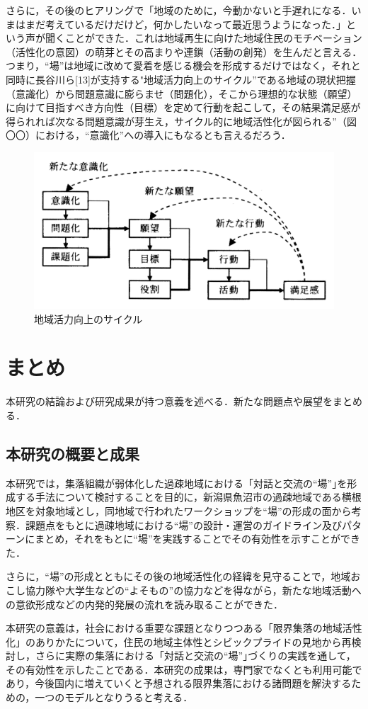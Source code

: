 \documentclass[a4paper]{jsarticle}
\begin{document}
さらに，その後のヒアリングで「地域のために，今動かないと手遅れになる．いまはまだ考えているだけだけど，何かしたいなって最近思うようになった．」という声が聞くことができた．これは地域再生に向けた地域住民のモチベーション（活性化の意図）の萌芽とその高まりや連鎖（活動の創発）を生んだと言える．つまり，“場”は地域に改めて愛着を感じる機会を形成するだけではなく，それと同時に長谷川ら[13]が支持する"地域活力向上のサイクル”である地域の現状把握（意識化）から問題意識に膨らませ（問題化），そこから理想的な状態（願望）に向けて目指すべき方向性（目標）を定めて行動を起こして，その結果満足感が得られれば次なる問題意識が芽生え，サイクル的に地域活性化が図られる”（図〇〇）における，“意識化”への導入にもなるとも言えるだろう．

\begin{figure}[H]
  \begin{center}
    \includegraphics[width=0.8\hsize]{./images/16.jpg}
    \caption{地域活力向上のサイクル
  }
    \label{fig:tmu_hino}
  \end{center}
\end{figure}

\newpage
\section{まとめ}
本研究の結論および研究成果が持つ意義を述べる．新たな問題点や展望をまとめる．

\subsection{本研究の概要と成果}

本研究では，集落組織が弱体化した過疎地域における「対話と交流の“場”｣を形成する手法について検討することを目的に，新潟県魚沼市の過疎地域である横根地区を対象地域とし，同地域で行われたワークショップを“場”の形成の面から考察．課題点をもとに過疎地域における“場”の設計・運営のガイドライン及びパターンにまとめ，それをもとに“場”を実践することでその有効性を示すことができた．\par
さらに，“場”の形成とともにその後の地域活性化の経緯を見守ることで，地域おこし協力隊や大学生などの“よそもの”の協力などを得ながら，新たな地域活動への意欲形成などの内発的発展の流れを読み取ることができた．\par
本研究の意義は，社会における重要な課題となりつつある「限界集落の地域活性化」のありかたについて，住民の地域主体性とシビックプライドの見地から再検討し，さらに実際の集落における「対話と交流の“場”｣づくりの実践を通して，その有効性を示したことである．本研究の成果は，専門家でなくとも利用可能であり，今後国内に増えていくと予想される限界集落における諸問題を解決するための，一つのモデルとなりうると考える．
\end{document}

